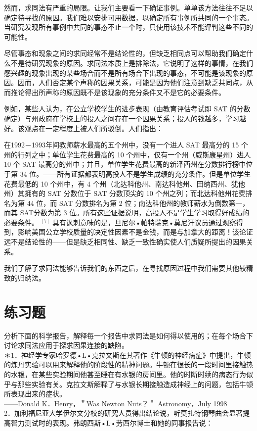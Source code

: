 然而，求同法有严重的局限。让我们主要看一下确证事例。单单该方法往往不足以确定待寻找的原因。我们难以安排可用数据，以确定所有事例所共同的一个事态。当研究发现所有事例中共同的事态不止一个时，只使用该技术不能评判这些不同的可能性。

尽管事态和现象之间的求同经常不是结论性的，但缺乏相同点可以帮助我们确定什么不是待研究现象的原因。求同法本质上是排除法，它说明了这样的事情，在我们感兴趣的现象出现的某些场合而不是所有场合下出现的事态，不可能是该现象的原因。因而，人们否定某个声称的因果关系，可能是因为他们注意到缺乏共同点，从而推论得出所声称的原因既不是该现象的充分条件又不是它的必要条件。

例如，某些人认为，在公立学校学生的进步表现（由教育评估考试即 SAT 的分数确定）与州政府在学校上的投人之间存在一个因果关系；投人的钱越多，学习越好。该观点在一定程度上被人们所驳倒。人们指出：

在1992－1993年间教师薪水最高的五个州中，没有一个进人 SAT 最高分的 15 个州的行列之中；单位学生花费最高的 10 个州中，仅有一个州（威斯康星州）进人 10 个 SAT 最高分的州中；并且，单位学生花费最高的新泽西州在分数排行榜中位于第 34 位。——所有证据都表明高投人不是学生成绩的充分条件。但是单位学生花费最低的 10 个州中，有 4 个州（北达科他州、南达科他州、田纳西州、犹他州）其拥有的 SAT 分数位于 SAT 分数顶尖的 10 个州之列；而北达科他州花费排名为第 44 位，而 SAT 分数排名为第 2 位；南达科他州的教师薪水为倒数第一，而其 SAT分数为第 3 位。所有这些证据说明，高投人不是学生学习取得好成绩的必要条件。 ${ }^{[7]}$ 具有讽刺意味的是，旦尼尔•帕特瑞克•莫尼汗议员通过观察得到，影响美国公立学校质量的决定性因素不是金钱，而是与加拿大的距离！该论证远不是结论性的——但是缺乏相同性、缺乏一致性确实使人们质疑所提出的因果关系。

我们了解了求同法能够告诉我们的东西之后，在寻找原因过程中我们需要其他较精致的归纳法。

\section*{练习题}
分析下面的科学报告，解释每一个报告中求同法是如何得以使用的；在每个场合下讨论求同法应用于探求因果连接的缺陷。\\
＊1．神经学专家哈罗德•L•克拉文斯在其著作《牛顿的神经病症》中提出，牛顿的炼丹实验可以用来解释他的阶段性的精神问题。牛顿在很长的一段时间里接触热的水银，在某些实验期间他甚至睡在有水银的房间里。他的时断时续的病态行为似乎与那些实验有关。克拉文斯解释了与水银长期接触造成神经上的问题，包括牛顿所表现出来的症状。\\
——Donald K．Henry，＂Was Newton Nuts？＂ Astronomy，July 1998\\
2．加利福尼亚大学伊尔文分校的研究人员得出结论说，听莫扎特钢琴曲会显著提高智力测试时的表现。弗朗西斯•L•劳西尔博士和她的同事报告说：

